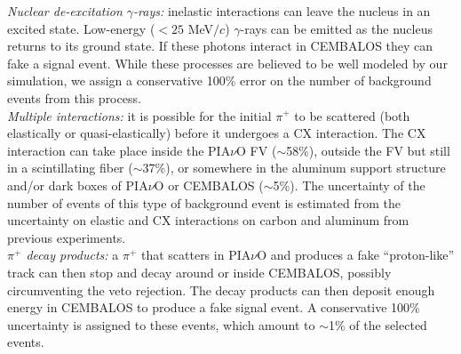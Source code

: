 { \it Nuclear de-excitation $\gamma$-rays:} inelastic interactions can leave the nucleus in an excited state. Low-energy ($<25$ MeV$/c$) $\gamma$-rays can be emitted as the nucleus returns to its ground state. If these photons interact in CEMBALOS they can fake a signal event. While these processes are believed to be well modeled by our simulation, we assign a conservative 100\% error on the number of background events from this process.\\

{ \it Multiple interactions: } it is possible for the initial $\pi^{+}$ to be scattered (both elastically or quasi-elastically) before it undergoes a CX interaction. The CX interaction can take place inside the PIA$\nu$O FV ($\sim$58\%), outside the FV but still in a scintillating fiber ($\sim$37\%), or somewhere in the aluminum support structure and/or dark boxes of PIA$\nu$O or CEMBALOS ($\sim$5\%). The uncertainty of the number of events of this type of background event is estimated from the uncertainty on elastic and CX interactions on carbon and aluminum from previous experiments.\\

{ \it $\pi^{+}$ decay products: } a $\pi^{+}$ that scatters in PIA$\nu$O and produces a fake ``proton-like'' track can then stop and decay around or inside CEMBALOS, possibly circumventing the veto rejection. The decay products can then deposit enough energy in CEMBALOS to produce a fake signal event. A conservative 100\% uncertainty is assigned to these events, which amount to $\sim$1\% of the selected events. %


